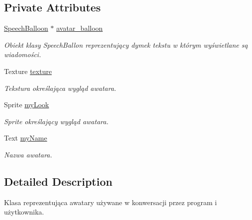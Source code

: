 \subsection*{Private Attributes}
\begin{DoxyCompactItemize}
\item 
\mbox{\label{class_avatar_a60467d688d94476f4306caea963b3023}} 
\mbox{\hyperlink{class_speech_balloon}{Speech\+Balloon}} $\ast$ \mbox{\hyperlink{class_avatar_a60467d688d94476f4306caea963b3023}{avatar\+\_\+balloon}}
\begin{DoxyCompactList}\small\item\em Obiekt klasy Speech\+Ballon reprezentujący dymek tekstu w którym wyświetlane są wiadomości. \end{DoxyCompactList}\item 
\mbox{\label{class_avatar_a275b3a29f2d8ddc19911bd2fb875a074}} 
Texture \mbox{\hyperlink{class_avatar_a275b3a29f2d8ddc19911bd2fb875a074}{texture}}
\begin{DoxyCompactList}\small\item\em Tekstura określająca wygląd awatara. \end{DoxyCompactList}\item 
\mbox{\label{class_avatar_a82d4ed2e9a1984dafbbe67ba06b006c7}} 
Sprite \mbox{\hyperlink{class_avatar_a82d4ed2e9a1984dafbbe67ba06b006c7}{my\+Look}}
\begin{DoxyCompactList}\small\item\em Sprite określający wygląd awatara. \end{DoxyCompactList}\item 
\mbox{\label{class_avatar_a01c53f093f9a0cd858be2ad68770fec5}} 
Text \mbox{\hyperlink{class_avatar_a01c53f093f9a0cd858be2ad68770fec5}{my\+Name}}
\begin{DoxyCompactList}\small\item\em Nazwa awatara. \end{DoxyCompactList}\end{DoxyCompactItemize}


\subsection{Detailed Description}
Klasa reprezentująca awatary używane w konwersacji przez program i użytkownika. 

